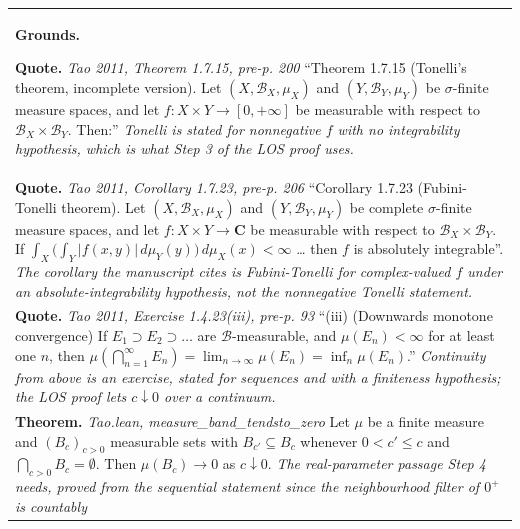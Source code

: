 \documentclass[10pt]{article}
\theoremstyle{definition}
\newlength{\fullw}\setlength{\fullw}{25.9cm}
\begin{document}
{\begin{longtable}{|p{0.9cm}|p{12.2cm}|p{12.2cm}|}
\multicolumn{3}{|p{\fullw}|}{\textbf{Grounds.}\par \textbf{Quote.} \textit{Tao 2011, Theorem 1.7.15, pre-p. 200} \newline ``Theorem 1.7.15 (Tonelli's theorem, incomplete version). Let
$(X, \mathcal{B}_X, \mu_X)$ and $(Y, \mathcal{B}_Y, \mu_Y)$ be $\sigma$-finite
measure spaces, and let $f : X \times Y \to [0, +\infty]$ be measurable with
respect to $\mathcal{B}_X \times \mathcal{B}_Y$. Then:'' \newline \textit{Tonelli is stated for nonnegative $f$ with no integrability
hypothesis, which is what Step 3 of the LOS proof uses.}} \\
\multicolumn{3}{|p{\fullw}|}{\textbf{Quote.} \textit{Tao 2011, Corollary 1.7.23, pre-p. 206} \newline ``Corollary 1.7.23 (Fubini-Tonelli theorem). Let
$(X, \mathcal{B}_X, \mu_X)$ and $(Y, \mathcal{B}_Y, \mu_Y)$ be complete
$\sigma$-finite measure spaces, and let $f : X \times Y \to \mathbf{C}$ be
measurable with respect to $\mathcal{B}_X \times \mathcal{B}_Y$. If
$\int_X \big(\int_Y |f(x,y)|\, d\mu_Y(y)\big)\, d\mu_X(x) < \infty$ \ldots
then $f$ is absolutely integrable''. \newline \textit{The corollary the manuscript cites is Fubini-Tonelli for
complex-valued $f$ under an absolute-integrability hypothesis, not the
nonnegative Tonelli statement.}} \\
\multicolumn{3}{|p{\fullw}|}{\textbf{Quote.} \textit{Tao 2011, Exercise 1.4.23(iii), pre-p. 93} \newline ``(iii) (Downwards monotone convergence) If $E_1 \supset E_2
\supset \ldots$ are $\mathcal{B}$-measurable, and $\mu(E_n) < \infty$ for at
least one $n$, then $\mu(\bigcap_{n=1}^{\infty} E_n) = \lim_{n \to \infty}
\mu(E_n) = \inf_n \mu(E_n)$.'' \newline \textit{Continuity from above is an exercise, stated for sequences and
with a finiteness hypothesis; the LOS proof lets $c \downarrow 0$ over a
continuum.}} \\
\multicolumn{3}{|p{\fullw}|}{\textbf{Theorem.} \textit{Tao.lean, measure\_band\_tendsto\_zero} \newline Let $\mu$ be a finite measure and $(B_c)_{c>0}$ measurable sets with
$B_{c'} \subseteq B_c$ whenever $0 < c' \le c$ and $\bigcap_{c > 0} B_c =
\emptyset$. Then $\mu(B_c) \to 0$ as $c \downarrow 0$. \newline \textit{The real-parameter passage Step 4 needs, proved from the
sequential statement since the neighbourhood filter of $0^{+}$ is countably
}}
\end{longtable}}
\end{document}
